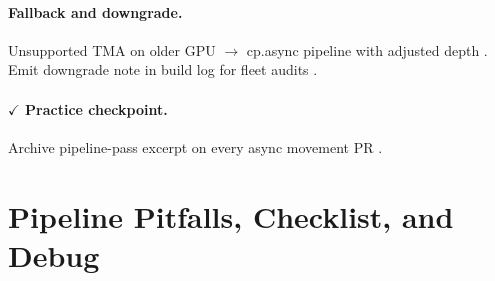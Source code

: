 \paragraph{Fallback and downgrade.}
Unsupported TMA on older GPU $\rightarrow$ cp.async pipeline with adjusted depth \citep{dao2022flashattention,yirage2026}.
Emit downgrade note in build log for fleet audits \citep{chen2020compilerbasedhardw,taxbreak2026}.

\paragraph{$\checkmark$ Practice checkpoint.}
Archive pipeline-pass excerpt on every async movement PR \citep{yirage2026,chen2020compilerbasedhardw}.

\section{Pipeline Pitfalls, Checklist, and Debug}
\label{sec:ch08_pipeline_pitfalls}

